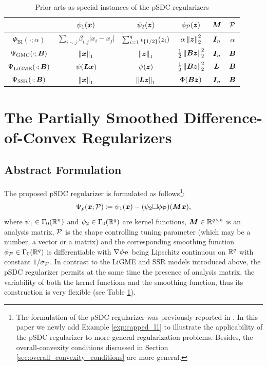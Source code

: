 \documentclass[lettersize,journal]{IEEEtran}
\theoremstyle{plain}%
\theoremstyle{definition}
\theoremstyle{remark}
\begin{document}
\renewcommand{\arraystretch}{1.5}
\begin{table}
\centering
\caption{Prior arts as special instances of the pSDC regularizers}
\label{table:pSDC_reproduce_prior_arts}
\begin{tabular}{|c|c|c|c|c|c|}
\hline
&  $\psi_1(\bm{x})$ & $\psi_2(\bm{z})$ & $\phi_{\mathcal{P}}(\bm{z})$ & $\bm{M}$ & $\mathcal{P}$\\
\hline
$\Psi_{\mathrm{BI}}(\cdot;\alpha)$ & $\sum_{i\sim j}\beta_{i,j}\lvert x_i-x_j \rvert$ & $\sum_{i=1}^q \iota_{\left\{ 1/2 \right\}}(z_i)$ & $\alpha\left\| \bm{z} \right\|^2_2$ & $\bm{I}_n$ & $\alpha$\\
\hline
$\Psi_{\mathrm{GMC}}(\cdot;\bm{B})$ & $\left\| \bm{x} \right\|_1$ & $\left\| \bm{z} \right\|_1$  & $\frac{1}{2}\left\| \bm{B}\bm{z} \right\|^2_2$ & $\bm{I}_n$ & $\bm{B}$\\
\hline
$\Psi_{\mathrm{LiGME}}(\cdot;\bm{B})$ & $\psi(\bm{L}\bm{x})$ & $\psi(\bm{z})$ &  $\frac{1}{2}\left\| \bm{B}\bm{z} \right\|^2_2$ & $\bm{L}$ & $\bm{B}$\\
\hline
$\Psi_{\mathrm{SSR}}(\cdot;\bm{B})$ & $\left\| \bm{x} \right\|_1$ & $\left\| \bm{L}\bm{z} \right\|_1$ & $\Phi(\bm{B}\bm{z})$ & $\bm{I}_n$ & $\bm{B}$\\
\hline
\end{tabular}
\end{table}

\section{The Partially Smoothed Difference-of-Convex Regularizers}
\label{sec:pSDC_regularizer}
\subsection{Abstract Formulation}
The proposed pSDC regularizer is formulated as follows\footnote{The formulation of the pSDC regularizer was previously reported in \cite{zhang2022}. In this paper we newly add Example \ref{exp:capped_l1} to illustrate the applicability of the pSDC regularizer to more general regularization problems. Besides, the overall-convexity conditions discussed in Section \ref{sec:overall_convexity_conditions} are more general.}:
\begin{equation}\label{eq:cp_regularizer}
\Psi_{{p}}(\bm{x};\mathcal{P})\coloneqq \psi_1(\bm{x})-(\psi_2\Box\phi_{\mathcal{P}})(\bm{M} \bm{x}),
\end{equation}
where $\psi_1\in\Gamma_0(\mathbb{R}^n)$ and $\psi_2\in\Gamma_0(\mathbb{R}^q)$ are kernel functions, $\bm{M}\in\mathbb{R}^{q\times n}$ is an analysis matrix, $\mathcal{P}$ is the shape controlling tuning parameter (which may be a number, a vector or a matrix) and the corresponding smoothing function $\phi_{\mathcal{P}}\in\Gamma_0(\mathbb{R}^q)$ is differentiable with $\nabla\phi_{\mathcal{P}}$ being Lipschitz continuous on $\mathbb{R}^q$ with constant $1/\sigma_{\mathcal{P}}$. In contrast to the LiGME and SSR models introduced above, the pSDC regularizer permits at the same time the presence of analysis matrix, the variability of both the kernel functions and the smoothing function, thus its construction is very flexible (see Table \ref{table:pSDC_reproduce_prior_arts}).
\end{document}
